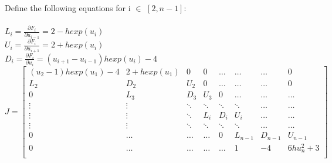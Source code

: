\documentclass[fleqn]{report}
\begin{document}
Define the following equations for i $\in$ $[2, n-1]$:\\\\
\indent $L_i = \frac{\partial F_i}{\partial u_{i-1}} = 2 - hexp(u_i)$\\ 
\indent $U_i = \frac{\partial F_i}{\partial u_{i+1}} = 2 + hexp(u_i)$\\
\indent $D_i = \frac{\partial F_i}{\partial u_i} =  (u_{i+1} - u_{i-1})hexp(u_i) -4$\\

\[
 J=
\left[ {\begin{array}{cccccccc}
(u_2 - 1)hexp(u_1) - 4 & 2 +hexp(u_1) & 0 & 0 & \hdots & \hdots & \hdots & 0 \\
L_2 & D_2 & U_2 & 0 & \hdots & \hdots & \hdots & 0 \\ 
0 & L_3 & D_3 & U_3 & 0 & \hdots & \hdots & \hdots \\
\vdots & \vdots & \ddots & \ddots & \ddots & \ddots & \hdots & \hdots\\
\vdots & \vdots & \ddots & L_i & D_i  & U_i & \hdots & \hdots \\
\vdots & \vdots & \ddots & \ddots & \ddots & \ddots & \hdots & \hdots \\
0 & \hdots & \hdots & \hdots & 0 & L_{n-1} & D_{n-1} & U_{n-1} \\
0 & \hdots & \hdots & \hdots & \hdots & 1 & -4 & 6hu^2_n + 3\\
  \end{array} } \right]
\]
\end{document}
